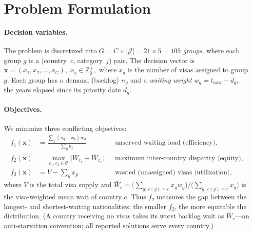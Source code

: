 \documentclass[runningheads]{llncs}
\begin{document}
\section{Problem Formulation}
\label{sec:formulation}

\paragraph{Decision variables.}
The problem is discretized into $G = C \times |\mathcal{J}| = 21 \times 5 = 105$ \emph{groups}, where each group $g$ is a (country~$c$, category~$j$) pair. The decision vector is
\(
\mathbf{x} = (x_1, x_2, \dots, x_G),\; x_g \in \mathbb{Z}^{+}_0,
\)
where $x_g$ is the number of visas assigned to group $g$. Each group has a demand (backlog) $n_g$ and a \emph{waiting weight} $w_g = t_{\text{now}} - d_g$, the years elapsed since its priority date $d_g$.

\paragraph{Objectives.}
We minimize three conflicting objectives:
\begin{align}
f_1(\mathbf{x}) &= \frac{\sum_{g}(n_g - x_g)\,w_g}{\sum_{g} n_g}
&&\text{unserved waiting load (efficiency),}\\
f_2(\mathbf{x}) &= \max_{c_1,c_2 \in \mathcal{C}}\bigl|\bar{W}_{c_1} - \bar{W}_{c_2}\bigr|
&&\text{maximum inter-country disparity (equity),}\\
f_3(\mathbf{x}) &= V - \textstyle\sum_{g} x_g
&&\text{wasted (unassigned) visas (utilization),}
\end{align}
where $V$ is the total visa supply and $\bar{W}_c = \big(\sum_{g:\,c(g)=c} x_g w_g\big)\big/\big(\sum_{g:\,c(g)=c} x_g\big)$ is the visa-weighted mean wait of country $c$. Thus $f_2$ measures the gap between the longest- and shortest-waiting nationalities: the smaller $f_2$, the more equitable the distribution. (A country receiving no visas takes its worst backlog wait as $\bar{W}_c$---an anti-starvation convention; all reported solutions serve every country.)
\end{document}
